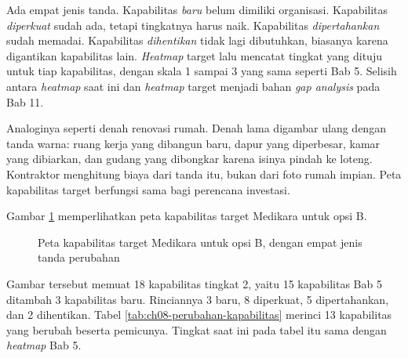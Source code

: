 Ada empat jenis tanda. Kapabilitas \emph{baru} belum dimiliki organisasi. Kapabilitas
\emph{diperkuat} sudah ada, tetapi tingkatnya harus naik. Kapabilitas \emph{dipertahankan}
sudah memadai. Kapabilitas \emph{dihentikan} tidak lagi dibutuhkan, biasanya karena
digantikan kapabilitas lain. \textit{Heatmap} target lalu mencatat tingkat yang dituju untuk
tiap kapabilitas, dengan skala 1 sampai 3 yang sama seperti Bab 5. Selisih antara
\textit{heatmap} saat ini dan \textit{heatmap} target menjadi bahan \textit{gap analysis} pada
Bab 11.

Analoginya seperti denah renovasi rumah. Denah lama digambar ulang dengan tanda warna:
ruang kerja yang dibangun baru, dapur yang diperbesar, kamar yang dibiarkan, dan gudang yang
dibongkar karena isinya pindah ke loteng. Kontraktor menghitung biaya dari tanda itu, bukan
dari foto rumah impian. Peta kapabilitas target berfungsi sama bagi perencana investasi.

Gambar \ref{fig:ch08-peta-kapabilitas} memperlihatkan peta kapabilitas target Medikara
untuk opsi B.

\begin{figure}[!htb]
  \centering
  
  \caption{Peta kapabilitas target Medikara untuk opsi B, dengan empat jenis tanda
           perubahan}
  \label{fig:ch08-peta-kapabilitas}
\end{figure}

Gambar tersebut memuat 18 kapabilitas tingkat 2, yaitu 15 kapabilitas Bab 5 ditambah 3
kapabilitas baru. Rinciannya 3 baru, 8 diperkuat, 5 dipertahankan, dan 2 dihentikan.
Tabel \ref{tab:ch08-perubahan-kapabilitas} merinci 13 kapabilitas yang berubah beserta
pemicunya. Tingkat saat ini pada tabel itu sama dengan \textit{heatmap} Bab 5.

